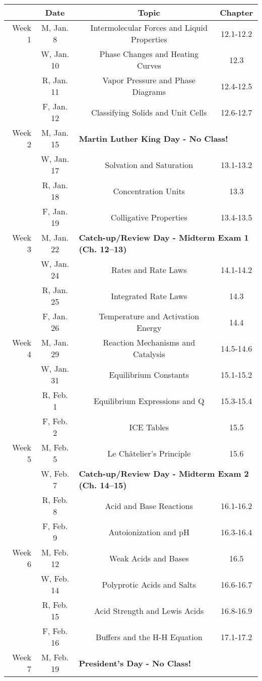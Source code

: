 \begin{tabular}{rcccc}
& Date && Topic & Chapter\\
\midrule
Week 1 & M, Jan. 8&& Intermolecular Forces and Liquid Properties & 12.1-12.2\\
& W, Jan. 10&& Phase Changes and Heating Curves & 12.3\\
& R, Jan. 11&& Vapor Pressure and Phase Diagrams & 12.4-12.5\\
& F, Jan. 12&& Classifying Solids and Unit Cells & 12.6-12.7\\
\midrule
Week 2 & M, Jan. 15& \multicolumn{3}{l}{\textbf{Martin Luther King Day - No Class!}}\\
& W, Jan. 17&& Solvation and Saturation & 13.1-13.2\\
& R, Jan. 18&& Concentration Units & 13.3\\
& F, Jan. 19&& Colligative Properties & 13.4-13.5\\
\midrule
Week 3 & M, Jan. 22& \multicolumn{3}{l}{\textbf{Catch-up/Review Day - Midterm Exam 1 (Ch. 12--13)}}\\
& W, Jan. 24&& Rates and Rate Laws & 14.1-14.2\\
& R, Jan. 25&& Integrated Rate Laws & 14.3\\
& F, Jan. 26&& Temperature and Activation Energy & 14.4\\
\midrule
Week 4 & M, Jan. 29&& Reaction Mechanisms and Catalysis & 14.5-14.6\\
& W, Jan. 31&& Equilibrium Constants & 15.1-15.2\\
& R, Feb. 1&& Equilibrium Expressions and Q & 15.3-15.4\\
& F, Feb. 2&& ICE Tables & 15.5\\
\midrule
Week 5 & M, Feb. 5&& Le Ch\^atelier's Principle & 15.6\\
& W, Feb. 7& \multicolumn{3}{l}{\textbf{Catch-up/Review Day - Midterm Exam 2 (Ch. 14--15)}}\\
& R, Feb. 8&& Acid and Base Reactions & 16.1-16.2\\
& F, Feb. 9&& Autoionization and pH & 16.3-16.4\\
\midrule
Week 6 & M, Feb. 12&& Weak Acids and Bases & 16.5\\
& W, Feb. 14&& Polyprotic Acids and Salts & 16.6-16.7\\
& R, Feb. 15&& Acid Strength and Lewis Acids & 16.8-16.9\\
& F, Feb. 16&& Buffers and the H-H Equation & 17.1-17.2\\
\midrule
Week 7 & M, Feb. 19& \multicolumn{3}{l}{\textbf{President's Day - No Class!}}\\

\end{tabular}
